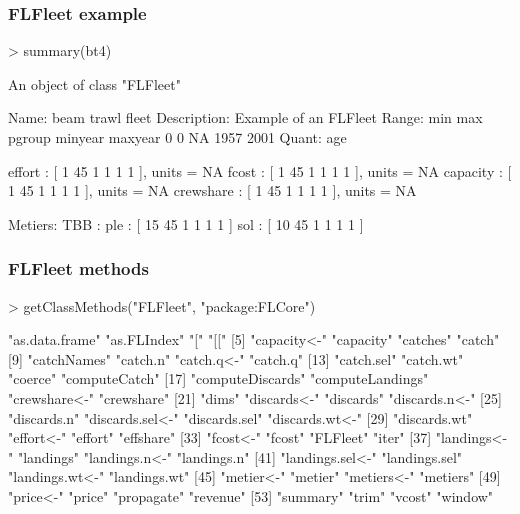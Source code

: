 \documentclass{beamer}%
\begin{document}
\begin{frame}[containsverbatim]
  \frametitle{FLFleet example}
{\tiny{
\begin{Schunk}
\begin{Sinput}
> summary(bt4)
\end{Sinput}
\begin{Soutput}
An object of class "FLFleet"

Name: beam trawl fleet 
Description: Example of an FLFleet 
Range:	 min	max	pgroup	minyear	maxyear 
	0	0	NA	1957	2001	
Quant: age 

effort        : [ 1 45 1 1 1 1 ], units =  NA 
fcost         : [ 1 45 1 1 1 1 ], units =  NA 
capacity      : [ 1 45 1 1 1 1 ], units =  NA 
crewshare     : [ 1 45 1 1 1 1 ], units =  NA 

Metiers:  
	 TBB :
		 ple : [ 15 45 1 1 1 1 ]
		 sol : [ 10 45 1 1 1 1 ]
\end{Soutput}
\end{Schunk}
}}
\end{frame}

\begin{frame}[containsverbatim]
  \frametitle{FLFleet methods}

{\tiny{
\begin{Schunk}
\begin{Sinput}
> getClassMethods("FLFleet", "package:FLCore")
\end{Sinput}
\begin{Soutput}
 [1] "as.data.frame"   "as.FLIndex"      "["               "[["             
 [5] "capacity<-"      "capacity"        "catches"         "catch"          
 [9] "catchNames"      "catch.n"         "catch.q<-"       "catch.q"        
[13] "catch.sel"       "catch.wt"        "coerce"          "computeCatch"   
[17] "computeDiscards" "computeLandings" "crewshare<-"     "crewshare"      
[21] "dims"            "discards<-"      "discards"        "discards.n<-"   
[25] "discards.n"      "discards.sel<-"  "discards.sel"    "discards.wt<-"  
[29] "discards.wt"     "effort<-"        "effort"          "effshare"       
[33] "fcost<-"         "fcost"           "FLFleet"         "iter"           
[37] "landings<-"      "landings"        "landings.n<-"    "landings.n"     
[41] "landings.sel<-"  "landings.sel"    "landings.wt<-"   "landings.wt"    
[45] "metier<-"        "metier"          "metiers<-"       "metiers"        
[49] "price<-"         "price"           "propagate"       "revenue"        
[53] "summary"         "trim"            "vcost"           "window"         
\end{Soutput}
\end{Schunk}
}}

\end{frame}
\end{document}
